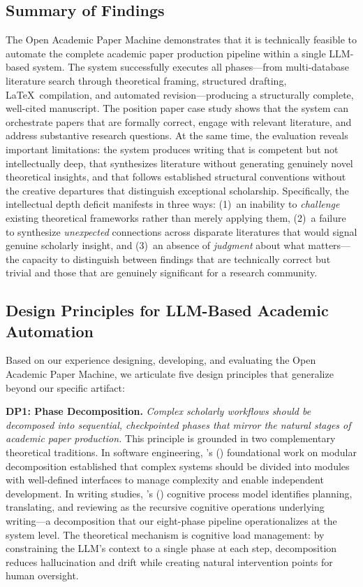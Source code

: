 \documentclass{article}
\begin{document}
\subsection{Summary of Findings}

The Open Academic Paper Machine demonstrates that it is technically feasible to automate the complete academic paper production pipeline within a single LLM-based system. The system successfully executes all phases---from multi-database literature search through theoretical framing, structured drafting, \LaTeX\ compilation, and automated revision---producing a structurally complete, well-cited manuscript. The position paper case study \citep{blask2026creator} shows that the system can orchestrate papers that are formally correct, engage with relevant literature, and address substantive research questions. At the same time, the evaluation reveals important limitations: the system produces writing that is competent but not intellectually deep, that synthesizes literature without generating genuinely novel theoretical insights, and that follows established structural conventions without the creative departures that distinguish exceptional scholarship. Specifically, the intellectual depth deficit manifests in three ways: (1)~an inability to \emph{challenge} existing theoretical frameworks rather than merely applying them, (2)~a failure to synthesize \emph{unexpected} connections across disparate literatures that would signal genuine scholarly insight, and (3)~an absence of \emph{judgment} about what matters---the capacity to distinguish between findings that are technically correct but trivial and those that are genuinely significant for a research community.

\subsection{Design Principles for LLM-Based Academic Automation}

Based on our experience designing, developing, and evaluating the Open Academic Paper Machine, we articulate five design principles that generalize beyond our specific artifact:

\textbf{DP1: Phase Decomposition.} \emph{Complex scholarly workflows should be decomposed into sequential, checkpointed phases that mirror the natural stages of academic paper production.} This principle is grounded in two complementary theoretical traditions. In software engineering, \citeauthor{parnas1972criteria}'s (\citeyear{parnas1972criteria}) foundational work on modular decomposition established that complex systems should be divided into modules with well-defined interfaces to manage complexity and enable independent development. In writing studies, \citeauthor{flower1981cognitive}'s (\citeyear{flower1981cognitive}) cognitive process model identifies planning, translating, and reviewing as the recursive cognitive operations underlying writing---a decomposition that our eight-phase pipeline operationalizes at the system level. The theoretical mechanism is cognitive load management: by constraining the LLM's context to a single phase at each step, decomposition reduces hallucination and drift while creating natural intervention points for human oversight.
\end{document}
